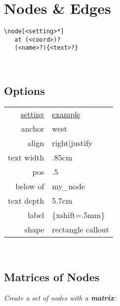\section{Nodes \& Edges}
\begin{minipage}{6.5cm}\begin{lstlisting}
\node[<setting>*]
   at (<coord>)?
   (<name>?){<text>?}
\end{lstlisting}\end{minipage}\\

\subsection*{Options}

\begin{tabularx}{4cm}{r l}
    \underline{setting} & \underline{example} \\
    anchor & west \\
    align & right|justify \\
    text width & .85cm \\
    pos & .5 \\
    below of & my\_node \\
    text depth & 5.7cm \\
    label & \{xshift=.5mm\} \\
    shape & rectangle callout \\ 
\end{tabularx} \ \\
\vspace{1mm}


\subsection*{Matrices of Nodes}

\textit{Create a set of nodes with a \textbf{matrix}:}\\
\\
\\
\\

